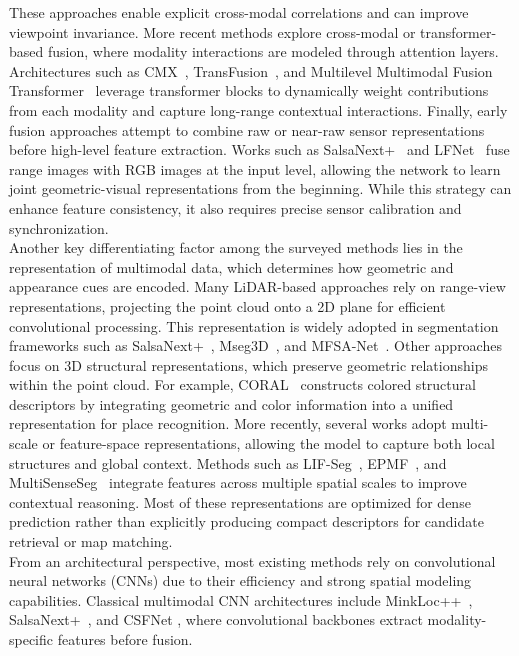 These approaches enable explicit cross-modal correlations and can improve viewpoint invariance. More recent methods explore cross-modal or transformer-based fusion, where modality interactions are modeled through attention layers. Architectures such as CMX~\cite{Zhang2023}, TransFusion~\cite{Maiti_2023_CVPR}, and Multilevel Multimodal Fusion Transformer~\cite{Ma2024} leverage transformer blocks to dynamically weight contributions from each modality and capture long-range contextual interactions.
Finally, early fusion approaches attempt to combine raw or near-raw sensor representations before high-level feature extraction. Works such as SalsaNext+~\cite{Snchez-Garca2025} and LFNet~\cite{Zhang2025} fuse range images with RGB images at the input level, allowing the network to learn joint geometric-visual representations from the beginning. While this strategy can enhance feature consistency, it also requires precise sensor calibration and synchronization. \\
Another key differentiating factor among the surveyed methods lies in the representation of multimodal data, which determines how geometric and appearance cues are encoded. Many LiDAR-based approaches rely on range-view representations, projecting the point cloud onto a 2D plane for efficient convolutional processing. This representation is widely adopted in segmentation frameworks such as SalsaNext+~\cite{Snchez-Garca2025}, Mseg3D~\cite{Li2023}, and MFSA-Net~\cite{Duan2024}. Other approaches focus on 3D structural representations, which preserve geometric relationships within the point cloud. For example, CORAL~\cite{pan2021coralcoloredstructuralrepresentation} constructs colored structural descriptors by integrating geometric and color information into a unified representation for place recognition.
More recently, several works adopt multi-scale or feature-space representations, allowing the model to capture both local structures and global context. Methods such as LIF-Seg~\cite{Zhao2024}, EPMF~\cite{Tan2024}, and MultiSenseSeg~\cite{Wang2024} integrate features across multiple spatial scales to improve contextual reasoning. Most of these representations are optimized for dense prediction rather than explicitly producing compact descriptors for candidate retrieval or map matching. \\
From an architectural perspective, most existing methods rely on convolutional neural networks (CNNs) due to their efficiency and strong spatial modeling capabilities. Classical multimodal CNN architectures include MinkLoc++~\cite{komorowski2021minkloclidarmonocularimage}, SalsaNext+~\cite{Snchez-Garca2025}, and CSFNet \cite{LuoYang2025}, where convolutional backbones extract modality-specific features before fusion.
